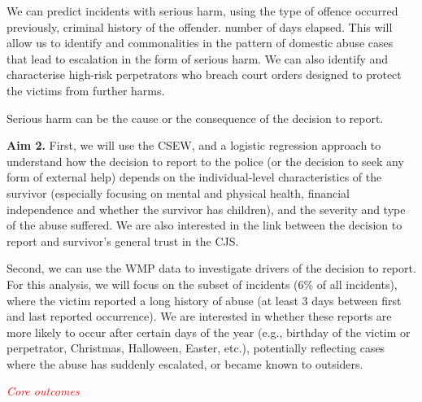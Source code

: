 \documentclass[11pt, a4paper]{article}
\begin{document}
We can predict incidents with serious harm, using the type of offence occurred previously, criminal history of the offender. number of days elapsed. This will allow us to identify and commonalities in the pattern of domestic abuse cases that lead to escalation in the form of serious harm. We can also identify and characterise high-risk perpetrators who breach court orders designed to protect the victims from further harms.



Serious harm can be the cause or the consequence of the decision to report.


\textbf{Aim 2.} First, we will use the CSEW, and a logistic regression approach to understand how the decision to report to the police (or the decision to seek any form of external help) depends on the individual-level characteristics of the survivor (especially focusing on mental and physical health, financial independence and whether the survivor has children), and the severity and type of the abuse suffered. We are also interested in the link between the decision to report and survivor's general trust in the CJS.

Second, we can use the WMP data to investigate drivers of the decision to report. For this analysis, we will focus on the subset of incidents (6\% of all incidents), where the victim reported a long history of abuse (at least 3 days between first and last reported occurrence). We are interested in whether these reports are more likely to occur after certain days of the year (e.g., birthday of the victim or perpetrator, Christmas, Halloween, Easter, etc.), potentially reflecting cases where the abuse has suddenly escalated, or became known to outsiders.



\textcolor{red}{\textit{Core outcomes}}

\end{document}
